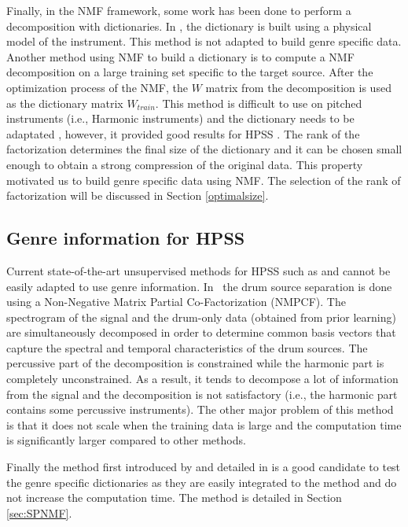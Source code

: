 \documentclass{article}
\begin{document}
Finally, in the NMF framework, some work has been done to perform a decomposition with dictionaries. In \cite{hennequin2011score}, the dictionary is built using a physical model of the instrument. This method is not adapted to build genre specific data. Another method using NMF to build a dictionary is to compute a NMF decomposition on a large training set specific to the target source. After the optimization process of the NMF, the $W$ matrix from the decomposition is used as the dictionary matrix $W_{train}$. This method is difficult to use on pitched instruments (i.e., Harmonic instruments) and the dictionary needs to be adaptated \cite{jaureguiberry2011adaptation}, however, it provided good results for HPSS \cite{larocheJournal}. The rank of the factorization determines the final size of the dictionary and it can be chosen small enough to obtain a strong compression of the original data. This property motivated us to build genre specific data using NMF. The selection of the rank of factorization will be discussed in Section \ref{optimalsize}.  

\subsection{Genre information for HPSS}

Current state-of-the-art unsupervised methods for HPSS such as \cite{ono2008separation} and \cite{canadas2014percussive} cannot be easily adapted to use genre information. In~\cite{kim2011nonnegative} the drum source separation is done using a Non-Negative Matrix Partial Co-Factorization (NMPCF). The spectrogram of the signal and the drum-only data (obtained from prior learning) are simultaneously decomposed in order to determine common basis vectors that capture the spectral and temporal characteristics of the drum sources. The percussive part of the decomposition is constrained while the harmonic part is completely unconstrained. As a result, it tends to decompose a lot of information from the signal and the decomposition is not satisfactory (i.e., the harmonic part contains some percussive instruments). The other major problem of this method is that it does not scale when the training data is large and the computation time is significantly larger compared to other methods.

Finally the method first introduced by \cite{laroche2015structured} and detailed in \cite{larocheJournal} is a good candidate to test the genre specific dictionaries as they are easily integrated to the method and do not increase the computation time. The method is detailed in Section \ref{sec:SPNMF}.
\end{document}
